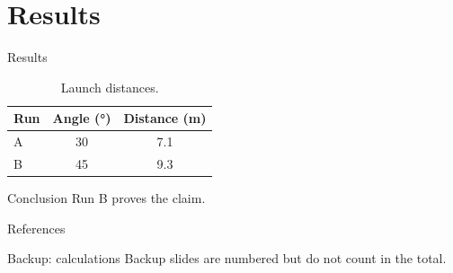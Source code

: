 \documentclass[aspectratio=169, 11pt]{beamer}
\begin{document}
\section{Results}

\begin{frame}{Results}
  \begin{table}
    \caption{Launch distances.}
    \begin{tabular}{lcc}
      \toprule
      \textbf{Run} & \textbf{Angle (\si{\degree})}
      & \textbf{Distance (\si{\metre})} \\
      \midrule
      A & 30 & 7.1 \\
      B & 45 & 9.3 \\
      \bottomrule
    \end{tabular}
  \end{table}
  \begin{alertblock}{Conclusion}
    Run B proves the claim.
  \end{alertblock}
\end{frame}

\begin{frame}{References}
  \printbibliography
\end{frame}

\appendix
\begin{frame}{Backup: calculations}
  Backup slides are numbered but do not count in the total.
\end{frame}
\end{document}
